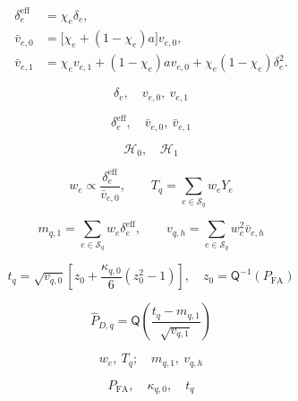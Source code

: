 \documentclass[12pt]{article}
\begin{document}
\begin{equation*}\displaystyle \begin{aligned}\delta_e^{\mathrm{eff}}&=\chi_e\delta_e,\\[6pt]\bar v_{e,0}&=\bigl[\chi_e+(1-\chi_e)a\bigr]v_{e,0},\\[6pt]\bar v_{e,1}&=\chi_ev_{e,1}+(1-\chi_e)av_{e,0}+\chi_e(1-\chi_e)\delta_e^2.\end{aligned}\end{equation*}

\begin{equation*}\displaystyle \delta_e,\quad v_{e,0},\ v_{e,1}\end{equation*}

\begin{equation*}\displaystyle \delta_e^{\mathrm{eff}},\quad\bar v_{e,0},\ \bar v_{e,1}\end{equation*}

\begin{equation*}\displaystyle \mathcal H_0,\quad\mathcal H_1\end{equation*}

\begin{equation*}\displaystyle w_e\propto\frac{\delta_e^{\mathrm{eff}}}{\bar v_{e,0}},\qquad T_q=\sum_{e\in\mathcal S_q}w_eY_e\end{equation*}

\begin{equation*}\displaystyle m_{q,1}=\sum_{e\in\mathcal S_q}w_e\delta_e^{\mathrm{eff}},\qquad v_{q,h}=\sum_{e\in\mathcal S_q}w_e^2\bar v_{e,h}\end{equation*}

\begin{equation*}\displaystyle t_q=\sqrt{v_{q,0}}\left[z_0+\frac{\kappa_{q,0}}6(z_0^2-1)\right],\quad z_0=\mathsf Q^{-1}(P_{\mathrm{FA}})\end{equation*}

\begin{equation*}\displaystyle \widehat P_{D,q}=\mathsf Q\!\left(\frac{t_q-m_{q,1}}{\sqrt{v_{q,1}}}\right)\end{equation*}

\begin{equation*}\displaystyle w_e,\ T_q;\quad m_{q,1},\ v_{q,h}\end{equation*}

\begin{equation*}\displaystyle P_{\mathrm{FA}},\quad\kappa_{q,0},\quad t_q\end{equation*}
\end{document}
